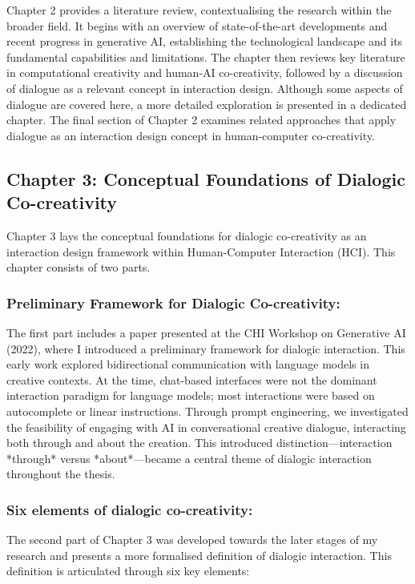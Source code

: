Chapter 2 provides a literature review, contextualising the research within the broader field. It begins with an overview of state-of-the-art developments and recent progress in generative AI, establishing the technological landscape and its fundamental capabilities and limitations. The chapter then reviews key literature in computational creativity and human-AI co-creativity, followed by a discussion of dialogue as a relevant concept in interaction design. Although some aspects of dialogue are covered here, a more detailed exploration is presented in a dedicated chapter. The final section of Chapter 2 examines related approaches that apply dialogue as an interaction design concept in human-computer co-creativity.

\subsection*{Chapter 3: Conceptual Foundations of Dialogic Co-creativity}

Chapter 3 lays the conceptual foundations for dialogic co-creativity as an interaction design framework within Human-Computer Interaction (HCI). This chapter consists of two parts. 

\subsubsection{Preliminary Framework for Dialogic Co-creativity: } The first part includes a paper presented at the CHI Workshop on Generative AI (2022), where I introduced a preliminary framework for dialogic interaction. This early work explored bidirectional communication with language models in creative contexts. At the time, chat-based interfaces were not the dominant interaction paradigm for language models; most interactions were based on autocomplete or linear instructions. Through prompt engineering, we investigated the feasibility of engaging with AI in conversational creative dialogue, interacting both through and about the creation. This introduced distinction—interaction *through* versus *about*—became a central theme of dialogic interaction throughout the thesis.

\subsubsection{Six elements of dialogic co-creativity:} The second part of Chapter 3 was developed towards the later stages of my research and presents a more formalised definition of dialogic interaction. This definition is articulated through six key elements:

